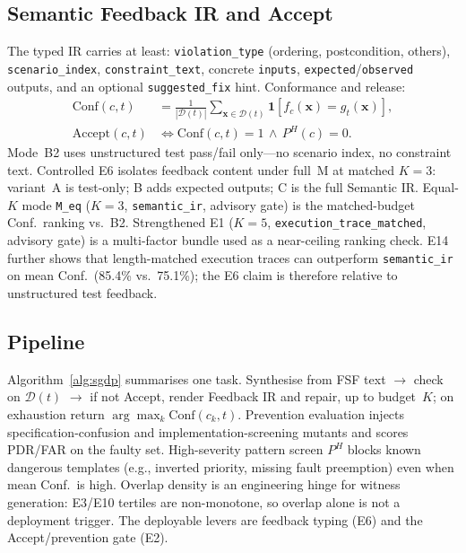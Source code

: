 \documentclass[10pt,conference]{IEEEtran}
\begin{document}
\subsection{Semantic Feedback IR and Accept}
The typed IR carries at least: \texttt{violation\_type} (ordering,
postcondition, others), \texttt{scenario\_index}, \texttt{constraint\_text},
concrete \texttt{inputs}, \texttt{expected}/\texttt{observed} outputs, and an
optional \texttt{suggested\_fix} hint.
Conformance and release:
\begin{align}
  \mathrm{Conf}(c,t)
  &= \tfrac{1}{|\mathcal{D}(t)|}
     \sum_{\mathbf{x}\in\mathcal{D}(t)}
     \mathbf{1}[f_c(\mathbf{x})=g_t(\mathbf{x})], \\
  \mathrm{Accept}(c,t)
  &\iff \mathrm{Conf}(c,t)=1 \,\land\, P^H(c)=0.
\end{align}
Mode~B2 uses unstructured test pass/fail only---no scenario index, no
constraint text.
Controlled E6 isolates feedback content under full~M at matched $K{=}3$:
variant~A is test-only; B adds expected outputs; C is the full Semantic IR.
Equal-$K$ mode \texttt{M\_eq} ($K{=}3$, \texttt{semantic\_ir}, advisory gate)
is the matched-budget Conf.\ ranking vs.\ B2.
Strengthened E1 ($K{=}5$, \texttt{execution\_trace\_matched}, advisory gate)
is a multi-factor bundle used as a near-ceiling ranking check.
E14 further shows that length-matched execution traces can outperform
\texttt{semantic\_ir} on mean Conf.\ (85.4\% vs.\ 75.1\%); the E6 claim is
therefore relative to unstructured test feedback.

\subsection{Pipeline}
Algorithm~\ref{alg:sgdp} summarises one task.
Synthesise from FSF text $\to$ check on $\mathcal{D}(t)$ $\to$
if not Accept, render Feedback IR and repair, up to budget~$K$; on exhaustion
return $\arg\max_k\mathrm{Conf}(c_k,t)$.
Prevention evaluation injects specification-confusion and
implementation-screening mutants and scores PDR/FAR on the faulty set.
High-severity pattern screen $P^H$ blocks known dangerous templates
(e.g., inverted priority, missing fault preemption) even when mean Conf.\ is
high.
Overlap density is an engineering hinge for witness generation: E3/E10
tertiles are non-monotone, so overlap alone is not a deployment trigger.
The deployable levers are feedback typing (E6) and the Accept/prevention gate
(E2).
\end{document}
